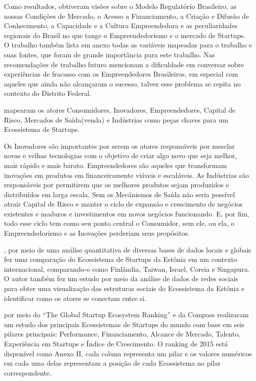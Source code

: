 Como resultados, obtiveram visões sobre o Modelo Regulatório Brasileiro, as nossas Condições de Mercado, o Acesso a Financiamento, a Criação e Difusão de Conhecimento, a Capacidade e a Cultura Empreendedora e as peculiaridades regionais do Brasil no que tange o Empreendedorismo e o mercado de Startups. O trabalho também lista em anexo todas as variáveis mapeadas para o trabalho e suas fontes, que foram de grande importância para este trabalho. Nas recomendações de trabalho futuro mencionam a dificuldade em conversar sobre experiências de fracasso com os Empreendedores Brasileiros, em especial com aqueles que ainda não alcançaram o sucesso, talvez esse problema se repita no contexto do Distrito Federal.

 mapearam os atores Consumidores, Inovadores, Empreendedores, Capital de Risco, Mercados de Saída(venda) e Indústrias como peças chaves para um Ecossistema de Startups. 

Os Inovadores são importantes por serem os atores responsáveis por mesclar novas e velhas tecnologias com o objetivo de criar algo novo que seja melhor, mais rápido e mais barato. Empreendedores são aqueles que transformam inovações em produtos em financeiramente viáveis e escaláveis. As Indústrias são responsáveis por permitirem que os melhores produtos sejam produzidos e distribuídos em larga escala. Sem os Mecânismos de Saída não seria possível atrair Capital de Risco e manter o ciclo de expansão e crescimento de negócios existentes e maduros e investimentos em novos negócios funcionando. E, por fim, todo esse ciclo tem como seu ponto central o Consumidor, sem ele, ou ela, o Empreendedorismo e as Inovações perderiam seus propósitos.

, por meio de uma análise quantitativa de diversas bases de dados locais e globais fez uma comparação do Ecossistema de Startups da Estônia em um contexto internacional, comparando-o como Finlândia, Taiwan, Israel, Coreia e Singapura. O autor também fez um estudo por meio da análise de dados de redes sociais para obter uma visualização das estruturas sociais do Ecossistema da Estônia e identificar como os atores se conectam entre si.

 por meio do ``The Global Startup Ecosystem Ranking'' e da Compass realizaram um estudo dos principais Ecossistemas de Startups do mundo com base em seis pilares principais: Performance, Financiamento, Alcance de Mercado, Talento, Experiência em Startups e Índice de Crescimento. O ranking de 2015 está disponível como Anexo II, cada coluna representa um pilar e os valores numéricos em cada uma delas representam a posição de cada Ecossistema no pilar correspondente. 


